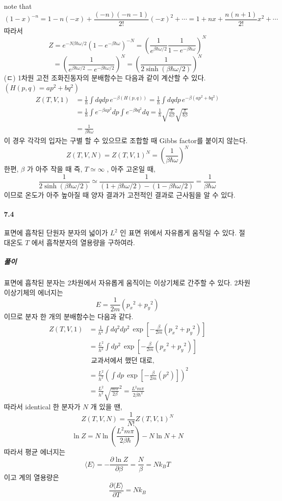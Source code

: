 \documentclass[a4paper,12pt]{report}
\begin{document}
	 note that 
	 $$(1-x)^{-n}=1-n(-x)+\frac{(-n)(-n-1)}{2!}(-x)^2+\cdots=1+nx+\frac{n(n+1)}{2!}x^2+\cdots$$
	 따라서
	 $$Z=e^{-N\beta\hbar\omega/2}(1-e^{-\beta\hbar\omega})^{-N}=\left(\frac{1}{e^{\beta\hbar\omega/2}}\frac{1}{1-e^{-\beta\hbar\omega}} \right)^N $$
	 $$=\left(\frac{1}{e^{\beta\hbar\omega/2}-e^{-\beta\hbar\omega/2}} \right)^N=\left(\frac{1}{2\sinh(\beta\hbar\omega/2)} \right)^N  $$
	 (ㄷ) 1차원 고전 조화진동자의 분배함수는 다음과 같이 계산할 수 있다. $(H(p,q)=ap^2+bq^2)$
	\begin{equation*}
		\begin{split}
		Z(T,V,1)&=\frac{1}{h}\int dqdp\,e^{-\beta(H(p,q))}=\frac{1}{h}\int dqdp\,e^{-\beta(ap^2+bq^2)}\\
		&=\frac{1}{h}\int e^{-\beta a p^2}dp\int e^{-\beta b q^2}dq=\frac{1}{h}\sqrt{\frac{\pi}{a\beta}}\sqrt{\frac{\pi}{b\beta}}\\
		&=\frac{1}{\beta\hbar\omega}
		\end{split}
	\end{equation*}
	이 경우 각각의 입자는 구별 할 수 있으므로  조합할 때 Gibbs factor를 붙이지 않는다. 
	$$Z(T,V,N)=Z(T,V,1)^N=\left(\frac{1}{\beta\hbar\omega} \right)^N $$
	한편, $\beta$ 가 아주 작을 때 즉, $T \simeq \infty$ , 아주 고온일 때,
	$$\frac{1}{2\sinh(\beta\hbar\omega/2)}\simeq\frac{1}{(1+\beta\hbar\omega/2)-(1-\beta\hbar\omega/2)}=\frac{1}{\beta\hbar\omega}$$
	이므로 온도가 아주 높아질 때 양자 결과가 고전적인 결과로 근사됨을 알 수 있다. 
	\paragraph{7.4 } 표면에 흡착된 단원자 분자의 넓이가 $L^2$ 인 표면 위에서 자유롭게 움직일 수 있다. 절대온도 $T$ 에서 흡착분자의 열용량을 구하여라.
	\subparagraph{풀이} 표면에 흡착된 분자는 2차원에서 자유롭게 움직이는 이상기체로 간주할 수 있다. 2차원 이상기체의 에너지는 
	$$E=\frac{1}{2m}({p_x}^2+{p_y}^2)$$ 이므로 분자 한 개의 분배함수는 다음과 같다. 
	\begin{equation*}
		\begin{split}
		Z(T,V,1)&=\frac{1}{h^2}\int dq^2dp^2\, \exp\left[-\frac{\beta}{2m}({p_x}^2+{p_y}^2) \right] \\
		&=\frac{L^2}{h^2}\int dp^2\, \exp\left[-\frac{\beta}{2m}({p_x}^2+{p_y}^2) \right]\\
		& \mbox{ 교과서에서 했던 대로, }\\
		&=\frac{L^2}{h^2}\left(\int dp\, \exp\left[-\frac{\beta}{2m}({p}^2) \right]\right)^2\\
		&=\frac{L^2}{h^2}\sqrt{\frac{m\pi}{2\beta}}^2=\frac{L^2m\pi}{2\beta\hbar^2}
		\end{split}
	\end{equation*}
	따라서 identical 한 분자가 $N$ 개 있을 땐,
	$$Z(T,V,N)=\frac{1}{N!}Z(T,V,1)^N$$
	$$\ln Z=N\ln\left(\frac{L^2m\pi}{2\beta\hbar} \right)-N\ln N+N $$
	따라서 평균 에너지는
	$$\langle E\rangle=-\frac{\partial \ln Z}{\partial \beta}=\frac{N}{\beta}=Nk_BT$$
	이고 계의 열용량은 
	$$\frac{\partial \langle E\rangle}{\partial T}=Nk_B$$
\end{document}
